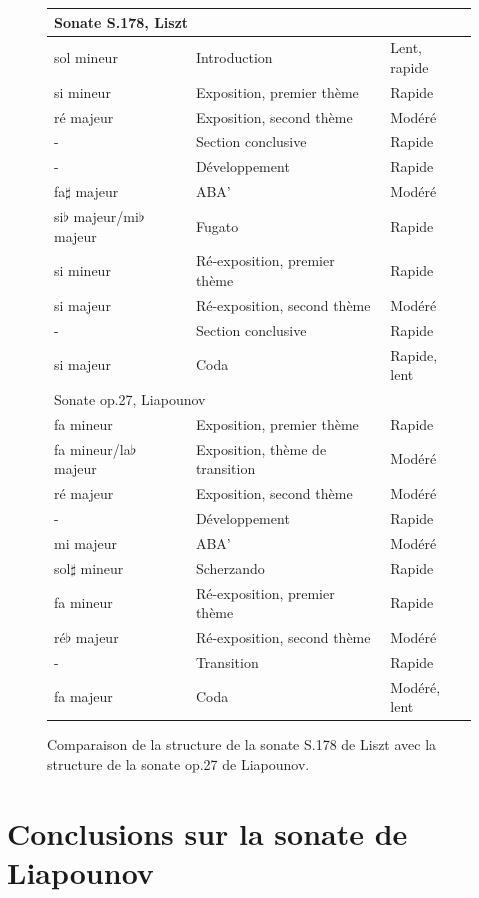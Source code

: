 \begin{figure}[!ht]
  \begin{bigcenter}
    \scalebox{0.875} {
\begin{tabular}{|l|l|l|}
 \hline
\multicolumn{3}{|l|}{Sonate S.178, Liszt}\\
 \hline
sol mineur & Introduction & Lent, rapide\\
si mineur & Exposition, premier thème & Rapide\\
ré majeur & Exposition, second thème & Modéré\\
- & Section conclusive & Rapide\\
- & Développement & Rapide\\
fa$\sharp$ majeur & ABA' & Modéré\\
si$\flat$ majeur/mi$\flat$ majeur & Fugato & Rapide\\
si mineur & Ré-exposition, premier thème & Rapide\\
si majeur & Ré-exposition, second thème & Modéré\\
- & Section conclusive & Rapide\\
si majeur & Coda & Rapide, lent\\
 \hline
 \hline
\multicolumn{3}{|l|}{Sonate op.27, Liapounov}\\
 \hline
fa mineur & Exposition, premier thème & Rapide\\
fa mineur/la$\flat$ majeur & Exposition, thème de transition & Modéré\\
ré majeur & Exposition, second thème & Modéré \\
- & Développement & Rapide\\
mi majeur & ABA' & Modéré\\
sol$\sharp$ mineur & Scherzando & Rapide\\
fa mineur & Ré-exposition, premier thème & Rapide\\
ré$\flat$ majeur & Ré-exposition, second thème & Modéré\\
- & Transition & Rapide\\
fa majeur & Coda & Modéré, lent\\
 \hline
\end{tabular}
    }
  \end{bigcenter}
  \caption{\label{sonate-liapounov-list2}Comparaison de la structure de la sonate S.178 de Liszt avec la structure de la sonate op.27 de Liapounov.}
\end{figure}

\section{Conclusions sur la sonate de Liapounov}

